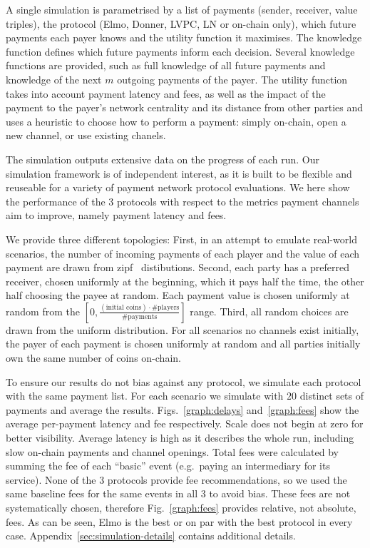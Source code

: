   A single simulation is parametrised by a list of payments
  (sender, receiver, value triples), the protocol (Elmo, Donner, LVPC, LN or
  on-chain only), which future payments each payer knows and the utility
  function it maximises. The knowledge function defines which future payments
  inform each decision. Several knowledge functions are provided, such as full
  knowledge of all future payments and knowledge of the next $m$ outgoing
  payments of the payer. The utility function takes into account payment
  latency and fees, as well as the impact of the payment to the payer's
  network centrality and its distance from other parties and uses a heuristic to
  choose how to perform a payment: simply on-chain, open a new channel, or use
  existing chanels.

  The simulation outputs extensive data on the progress of each run. Our
  simulation framework is of independent interest, as it is built to be flexible
  and reuseable for a variety of payment network protocol evaluations. We here
  show the performance of the $3$ protocols with respect to the metrics payment
  channels aim to improve, namely payment latency and fees.

  We provide three different topologies: First, in an attempt to emulate
  real-world scenarios, the number of incoming payments of each player and the
  value of each payment are drawn from zipf~\cite{powers-1998-applications}
  distibutions. Second, each party has a preferred receiver, chosen uniformly at
  the beginning, which it pays half the time, the other half choosing the payee
  at random. Each payment value is chosen uniformly at random from the $[0,
  \frac{(\text{initial coins}) \cdot \text{\#players}}{\text{\#payments}}]$
  range. Third, all random choices are drawn from the uniform distribution.
  For all scenarios no channels exist initially, the payer of each payment is
  chosen uniformly at random and all parties initially own the same number of
  coins on-chain.

  To ensure our results do not bias against any protocol, we simulate each
  protocol with the same payment list. For each scenario we simulate with $20$
  distinct sets of payments and average the results. Figs.~\ref{graph:delays}
  and~\ref{graph:fees} show the average per-payment latency and fee
  respectively. Scale does not begin at zero for better visibility. Average
  latency is high as it describes the whole run, including slow on-chain
  payments and channel openings. Total fees were calculated by summing the fee
  of each ``basic'' event (e.g.\ paying an intermediary for its service). None
  of the $3$ protocols provide fee recommendations, so we used the same baseline
  fees for the same events in all $3$ to avoid bias. These
  fees are not systematically chosen, therefore Fig.~\ref{graph:fees} provides
  relative, not absolute, fees. As can be seen, Elmo is the best or on par with
  the best protocol in every case. Appendix~\ref{sec:simulation-details}
  contains additional details.

